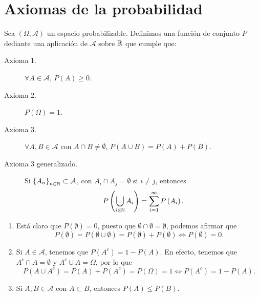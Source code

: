 \section{Axiomas de la probabilidad}
\begin{definition}
Sea $\displaystyle \left(\Omega, \mathcal{A}\right) $ un espacio probabilizable. Definimos una función de conjunto $\displaystyle P $ dediante una aplicación de $\displaystyle \mathcal{A} $ sobre $\displaystyle \mathbb{R} $ que cumple que:
\begin{description}
\item[Axioma 1.] $\displaystyle \forall A \in \mathcal{A} $, $\displaystyle P\left(A\right) \geq 0 $.
\item[Axioma 2.] $\displaystyle P\left(\Omega \right)= 1 $.
\item[Axioma 3.] $\displaystyle \forall A,B \in \mathcal{A} $ con $\displaystyle A \cap B \neq \emptyset $, $\displaystyle P\left(A \cup B\right) = P\left(A\right) + P\left(B\right) $.
\item[Axioma 3 generalizado.] Si $\displaystyle \left\{ A_{n}\right\} _{n\in \mathbb{N}} \subset \mathcal{A} $, con $\displaystyle A_{i} \cap A_{j} = \emptyset $ si $\displaystyle i \neq j $, entonces
	\[P\left(\bigcup_{i \in \mathbb{N}}A_{i}\right) = \sum^{\infty}_{i = 1}P\left(A_{i}\right) .\]
\end{description}
\end{definition}
\begin{observation}
\begin{enumerate}
\item Está claro que $\displaystyle P\left(\emptyset\right) = 0 $, puesto que $\displaystyle \emptyset \cap \emptyset = \emptyset $, podemos afirmar que
	\[P\left(\emptyset\right) = P\left(\emptyset \cup \emptyset\right) = P\left(\emptyset\right) + P\left(\emptyset\right) \iff P\left(\emptyset\right) = 0 .\]
\item Si $\displaystyle A \in \mathcal{A} $, tenemos que $\displaystyle P\left(A^{c}\right) = 1 - P\left(A\right) $. En efecto, tenemos que $\displaystyle A^{c} \cap A = \emptyset $ y $\displaystyle A^{c} \cup A = \Omega  $, por lo que
	\[P\left(A \cup A^{c} \right) = P\left(A\right) + P\left(A^{c}\right) = P\left(\Omega \right) = 1 \iff P\left(A^{c}\right) = 1 - P\left(A\right) .\]
\item Si $\displaystyle A,B \in \mathcal{A} $ con $\displaystyle A \subset B $, entonces $\displaystyle P\left(A\right) \leq P\left(B\right) $.
\end{enumerate}
\end{observation}

